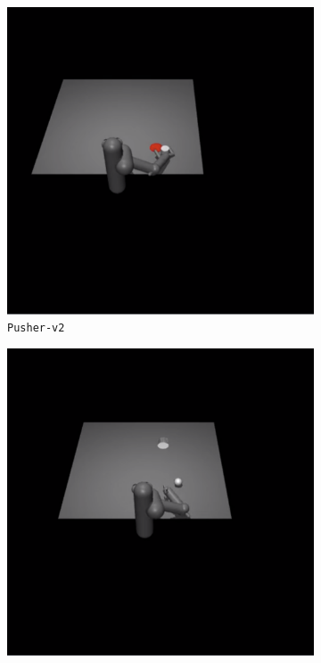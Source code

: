 \begin{subappendices}
\begin{figure}[h]
\centering
\begin{subfigure}[t]{0.3\textwidth}
    \includegraphics[width=\textwidth]{figures/dyne/Pusher.png}
    \caption{\texttt{Pusher-v2}}
\end{subfigure}
\begin{subfigure}[t]{0.3\textwidth}
    \includegraphics[width=\textwidth]{figures/dyne/Striker.png}

\end{subfigure}
\end{figure}
\end{subappendices}
